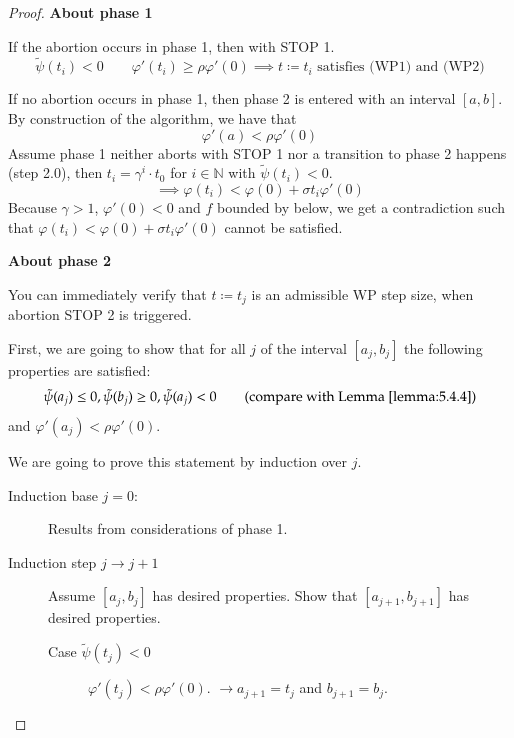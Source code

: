 \documentclass[a4paper]{article}
\numberwithin{lecref}{subsection}
\begin{document}
\begin{proof}
	\textbf{About phase 1}

	If the abortion occurs in phase 1, then with STOP 1.
	\[ \tilde \psi(t_i) < 0 \qquad \varphi'(t_i) \geq \rho \varphi'(0) \implies t \coloneqq t_i \text{ satisfies (WP1) and (WP2)} \]

	If no abortion occurs in phase 1, then phase 2 is entered with an interval $[a, b]$.
	By construction of the algorithm, we have that
	\[ \varphi'(a) < \rho \varphi'(0) \]
	Assume phase 1 neither aborts with STOP 1 nor a transition to phase 2 happens (step 2.0),
	then $t_i = \gamma^i \cdot t_0$ for $i \in \mathbb N$ with $\tilde \psi(t_i) < 0$.
	\[ \implies \varphi(t_i) < \varphi(0) + \sigma t_i \varphi'(0) \]
	Because $\gamma > 1$, $\varphi'(0) < 0$ and $f$ bounded by below, we get a contradiction such that $\varphi(t_i) < \varphi(0) + \sigma t_i \varphi'(0)$ cannot be satisfied.

	\textbf{About phase 2}

	You can immediately verify that $t \coloneqq t_j$ is an admissible WP step size, when abortion STOP 2 is triggered.

	First, we are going to show that for all $j$ of the interval $[a_j, b_j]$ the following properties are satisfied:
	\[ \tilde\psi(a_j) \leq 0, \tilde\psi(b_j) \geq 0, \tilde\psi(a_j) < 0 \qquad \text{(compare with Lemma~\ref{lemma:5.4.4})} \]
	and $\varphi'(a_j) < \rho \varphi'(0)$.

	We are going to prove this statement by induction over $j$.

	\begin{description}
		\item[Induction base $j=0$:]
			Results from considerations of phase 1.
		\item[Induction step $j \to j+1$]
			Assume $[a_j, b_j]$ has desired properties.
			Show that $[a_{j+1}, b_{j+1}]$ has desired properties.

			\begin{description}
				\item[Case $\tilde\psi(t_j) < 0$]
					$\varphi'(t_j) < \rho \varphi'(0)$.
					$\to a_{j+1} = t_j$ and $b_{j+1} = b_j$.


\end{description}
\end{description}
\end{proof}
\end{document}
